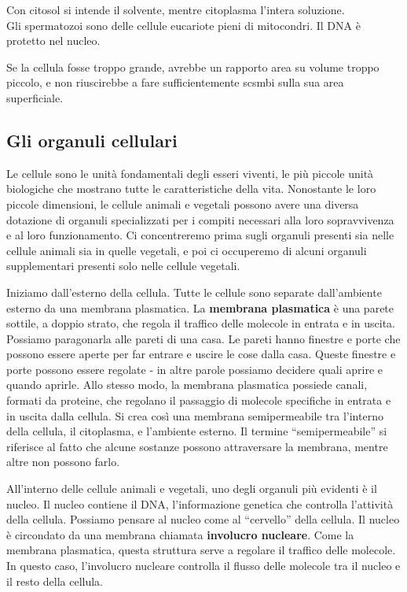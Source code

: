 \documentclass[a4paper]{article}
\begin{document}
Con citosol si intende il solvente, mentre citoplasma l'intera soluzione.
\\
Gli spermatozoi sono delle cellule eucariote pieni di mitocondri.
Il DNA è protetto nel nucleo.

Se la cellula fosse troppo grande, avrebbe un rapporto area su volume troppo piccolo, e non riuscirebbe
a fare sufficientemente scsmbi sulla sua area superficiale.

\subsection{Gli organuli cellulari}

Le cellule sono le unità fondamentali degli esseri viventi, le più piccole unità biologiche che
mostrano tutte le caratteristiche della vita. Nonostante le loro piccole dimensioni, le cellule
animali e vegetali possono avere una diversa dotazione di organuli specializzati per i compiti
necessari alla loro sopravvivenza e al loro funzionamento. Ci concentreremo prima sugli
organuli presenti sia nelle cellule animali sia in quelle vegetali, e poi ci occuperemo di alcuni
organuli supplementari presenti solo nelle cellule vegetali.

Iniziamo dall'esterno della cellula. Tutte le cellule sono separate dall'ambiente esterno da
una membrana plasmatica. La \textbf{membrana plasmatica} è una parete sottile, a doppio strato,
che regola il traffico delle molecole in entrata e in uscita. Possiamo paragonarla alle pareti
di una casa. Le pareti hanno finestre e porte che possono essere aperte per far entrare e
uscire le cose dalla casa. Queste finestre e porte possono essere regolate - in altre parole
possiamo decidere quali aprire e quando aprirle. Allo stesso modo, la membrana plasmatica
possiede canali, formati da proteine, che regolano il passaggio di molecole specifiche in
entrata e in uscita dalla cellula. Si crea così una membrana semipermeabile tra l'interno
della cellula, il citoplasma, e l'ambiente esterno. Il termine “semipermeabile” si riferisce al
fatto che alcune sostanze possono attraversare la membrana, mentre altre non possono
farlo.

All'interno delle cellule animali e vegetali, uno degli organuli più evidenti è il nucleo. Il nucleo
contiene il DNA, l'informazione genetica che controlla l'attività della cellula. Possiamo
pensare al nucleo come al “cervello” della cellula. Il nucleo è circondato da una membrana
chiamata \textbf{involucro nucleare}. Come la membrana plasmatica, questa struttura serve a
regolare il traffico delle molecole. In questo caso, l'involucro nucleare controlla il flusso delle
molecole tra il nucleo e il resto della cellula.
\end{document}
